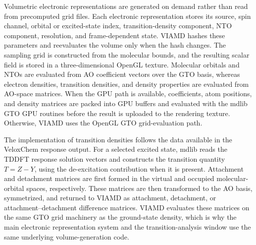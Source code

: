 \documentclass[journal=jacsat,manuscript=article]{achemso}
\begin{document}
Volumetric electronic representations are generated on demand rather than read from precomputed grid files. Each electronic representation stores its source, spin channel, orbital or excited-state index, transition-density component, NTO component, resolution, and frame-dependent state. VIAMD hashes these parameters and reevaluates the volume only when the hash changes. The sampling grid is constructed from the molecular bounds, and the resulting scalar field is stored in a three-dimensional OpenGL texture. Molecular orbitals and NTOs are evaluated from AO coefficient vectors over the GTO basis, whereas electron densities, transition densities, and density properties are evaluated from AO-space matrices. When the GPU path is available, coefficients, atom positions, and density matrices are packed into GPU buffers and evaluated with the mdlib GTO GPU routines before the result is uploaded to the rendering texture. Otherwise, VIAMD uses the OpenGL GTO grid-evaluation path.

The implementation of transition densities follows the data available in the VeloxChem response output. For a selected excited state, mdlib reads the TDDFT response solution vectors and constructs the transition quantity \(T = Z - Y\), using the de-excitation contribution when it is present. Attachment and detachment matrices are first formed in the virtual and occupied molecular-orbital spaces, respectively. These matrices are then transformed to the AO basis, symmetrized, and returned to VIAMD as attachment, detachment, or attachment--detachment difference matrices. VIAMD evaluates these matrices on the same GTO grid machinery as the ground-state density, which is why the main electronic representation system and the transition-analysis window use the same underlying volume-generation code.
\end{document}
